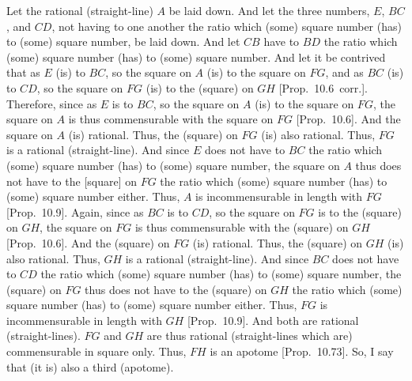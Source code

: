 \begin{Parallel}{}{}
{Let the rational (straight-line) $A$ be laid down. And let the
three numbers, $E$, $BC$, and $CD$, not having to one another
the ratio which (some) square number (has) to (some) square number,
be laid down. And let $CB$ have to $BD$ the ratio which (some)
square number (has) to (some) square number. And let it be
contrived that as $E$ (is) to $BC$, so the square on $A$ (is) to the square
on $FG$, and as $BC$ (is) to $CD$, so the square on $FG$ (is) to the (square)
on $GH$ [Prop.~10.6~corr.]. Therefore,
since  as $E$ is to $BC$, so the square on $A$ (is) to the square on
$FG$, the square on $A$ is thus commensurable with the square on
$FG$ [Prop.~10.6]. And the square on $A$
(is) rational. Thus, the (square) on $FG$ (is) also rational. Thus,
$FG$ is a rational (straight-line). And since  $E$ does not have to $BC$
the ratio which (some) square number (has) to (some) square number,
the square on $A$ thus does not have to the [square] on $FG$ the ratio
which (some) square number (has) to (some) square number either. Thus,
$A$ is incommensurable in length with $FG$ [Prop.~10.9]. Again, since as $BC$ is to $CD$, so
the square on $FG$ is to the (square) on $GH$, the square on $FG$
is thus commensurable with the (square) on $GH$ [Prop.~10.6]. And the (square) on $FG$ (is)
rational. Thus, the (square) on $GH$ (is) also rational. Thus, $GH$ is
a rational (straight-line). And since $BC$ does not have to $CD$ the
ratio which (some) square number (has) to (some) square number, the
(square) on $FG$ thus does not have to the (square) on $GH$ the
ratio which (some) square number (has) to (some) square number either.
Thus, $FG$ is incommensurable in length with $GH$ [Prop.~10.9]. And both are rational (straight-lines).
$FG$ and $GH$ are thus rational (straight-lines which are) commensurable
in square only. Thus, $FH$ is an apotome [Prop.~10.73]. So, I say that (it is) also a third
(apotome).

}
\end{Parallel}
